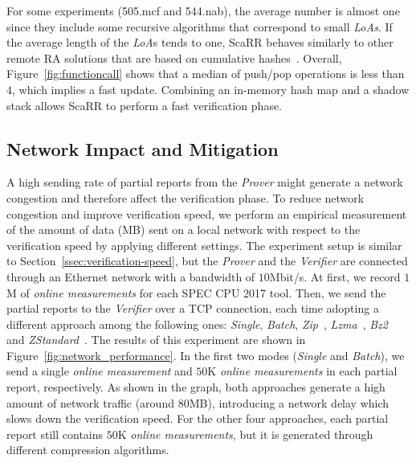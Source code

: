 For some experiments (\ie 505.mcf and 544.nab), the average number is almost 
one since they include some recursive algorithms that correspond to small 
\emph{LoAs}. If the average length of the \emph{LoA}s tends to one, ScaRR 
behaves similarly to other remote RA solutions that are based on cumulative 
hashes~\cite{abera2016c,aberadiat}. Overall, Figure~\ref{fig:functioncall} 
shows that a median of push/pop operations is less than $4$, which implies a 
fast update.
Combining an in-memory hash map and a shadow stack allows ScaRR to perform a 
fast verification phase.


\subsection{Network Impact and Mitigation}
\label{ssec:network-impact}
A high sending rate of partial reports from the \emph{Prover}
might generate a network congestion and therefore affect the verification phase.
To reduce network congestion and improve verification speed, we perform an 
empirical measurement of 
the amount of data (\ie MB) sent on a local network with respect to the 
verification speed by applying different settings.
The experiment setup is similar to Section~\ref{ssec:verification-speed}, but 
the \emph{Prover} and the \emph{Verifier} are connected through an Ethernet 
network with a bandwidth of $10$Mbit/s.
At first, we record $1$M of \emph{online measurements} for each SPEC CPU 2017 
tool.
Then, we send the partial reports to the \emph{Verifier} over a TCP connection,
each time adopting a different approach among the following ones:
\emph{Single}, \emph{Batch}, \emph{Zip}~\cite{zip}, \emph{Lzma}~\cite{lzma}, 
\emph{Bz2}~\cite{bz2} and \emph{ZStandard}~\cite{zstandard}. 
The results of this experiment are shown in 
Figure~\ref{fig:network_performance}. 
In the first two modes (\ie \emph{Single} and  \emph{Batch}),
we send a single \emph{online measurement} and $50$K
\emph{online measurements} in each partial report, respectively.
As shown in the graph, both approaches generate a high amount of network 
traffic (around $80$MB),
introducing a network delay which slows down the verification speed.
For the other four approaches, each partial report still contains $50$K 
\emph{online measurements},
but it is generated through different compression algorithms.
